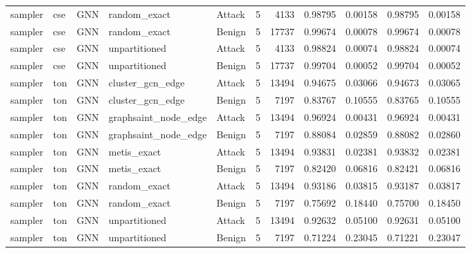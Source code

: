 \begin{tabular}{lllllrrrrrr}
sampler & cse & GNN & random_exact & Attack & 5 & 4133 & 0.98795 & 0.00158 & 0.98795 & 0.00158 \\
sampler & cse & GNN & random_exact & Benign & 5 & 17737 & 0.99674 & 0.00078 & 0.99674 & 0.00078 \\
sampler & cse & GNN & unpartitioned & Attack & 5 & 4133 & 0.98824 & 0.00074 & 0.98824 & 0.00074 \\
sampler & cse & GNN & unpartitioned & Benign & 5 & 17737 & 0.99704 & 0.00052 & 0.99704 & 0.00052 \\
sampler & ton & GNN & cluster_gcn_edge & Attack & 5 & 13494 & 0.94675 & 0.03066 & 0.94673 & 0.03065 \\
sampler & ton & GNN & cluster_gcn_edge & Benign & 5 & 7197 & 0.83767 & 0.10555 & 0.83765 & 0.10555 \\
sampler & ton & GNN & graphsaint_node_edge & Attack & 5 & 13494 & 0.96924 & 0.00431 & 0.96924 & 0.00431 \\
sampler & ton & GNN & graphsaint_node_edge & Benign & 5 & 7197 & 0.88084 & 0.02859 & 0.88082 & 0.02860 \\
sampler & ton & GNN & metis_exact & Attack & 5 & 13494 & 0.93831 & 0.02381 & 0.93832 & 0.02381 \\
sampler & ton & GNN & metis_exact & Benign & 5 & 7197 & 0.82420 & 0.06816 & 0.82421 & 0.06816 \\
sampler & ton & GNN & random_exact & Attack & 5 & 13494 & 0.93186 & 0.03815 & 0.93187 & 0.03817 \\
sampler & ton & GNN & random_exact & Benign & 5 & 7197 & 0.75692 & 0.18440 & 0.75700 & 0.18450 \\
sampler & ton & GNN & unpartitioned & Attack & 5 & 13494 & 0.92632 & 0.05100 & 0.92631 & 0.05100 \\
sampler & ton & GNN & unpartitioned & Benign & 5 & 7197 & 0.71224 & 0.23045 & 0.71221 & 0.23047 \\
\bottomrule
\end{tabular}
